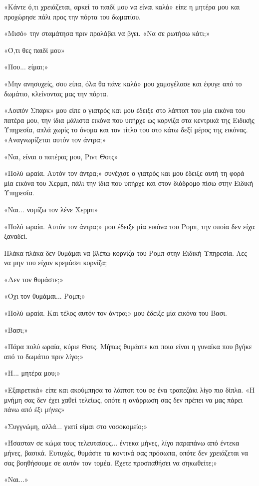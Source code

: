 \documentclass[12pt,twoside, openany]{book}
\begin{document}
«Κάντε ό,τι χρειάζεται, αρκεί το παιδί μου να είναι καλά» είπε η μητέρα μου και προχώρησε πάλι προς την πόρτα του δωματίου.

«Μισό» την σταμάτησα πριν προλάβει να βγει. «Να σε ρωτήσω κάτι;»

«Ό,τι θες παιδί μου»

«Που... είμαι;»

«Μην ανησυχείς, σου είπα, όλα θα πάνε καλά» μου χαμογέλασε και έφυγε από το δωμάτιο, κλείνοντας μας την πόρτα.

«Λοιπόν Σπαρκ» μου είπε ο γιατρός και μου έδειξε στο λάπτοπ του μία εικόνα του πατέρα μου, την ίδια μάλιστα εικόνα που υπήρχε ως κορνίζα στα κεντρικά της Ειδικής Υπηρεσία, απλά χωρίς το όνομα και τον τίτλο του στο κάτω δεξί μέρος της εικόνας. «Αναγνωρίζεται αυτόν τον άντρα;»

«Ναι, είναι ο πατέρας μου, Ριντ Θοτς»

«Πολύ ωραία. Αυτόν τον άντρα;» συνέχισε ο γιατρός και μου έδειξε αυτή τη φορά μία εικόνα του Χερμπ, πάλι την ίδια που υπήρχε και στον διάδρομο πίσω στην Ειδική Υπηρεσία.

«Ναι... νομίζω τον λένε Χερμπ»

«Πολύ ωραία. Αυτόν τον άντρα;» μου έδειξε μία εικόνα του Ρομπ, την οποία δεν είχα ξαναδεί.

Πλάκα πλάκα δεν θυμάμαι να βλέπω κορνίζα του Ρομπ στην Ειδική Υπηρεσία. Λες να μην του είχαν κρεμάσει κορνίζα;

«Δεν τον θυμάστε;»

«Όχι τον θυμάμαι... Ρομπ;»

«Πολύ ωραία. Και τέλος αυτόν τον άντρα;» μου έδειξε μία εικόνα του Βασι.

«Βασι;»

«Πάρα πολύ ωραία, κύριε Θοτς. Μήπως θυμάστε και ποια είναι η γυναίκα που βγήκε από το δωμάτιο πριν λίγο;»

«Η... μητέρα μου;»

«Εξαιρετικά» είπε και ακούμπησα το λάπτοπ του σε ένα τραπεζάκι λίγο πιο δίπλα. «Η μνήμη σας δεν έχει χαθεί τελείως, οπότε η ανάρρωση σας δεν πρέπει να μας πάρει πάνω από έξι μήνες»

«Συγγνώμη, αλλά... γιατί είμαι στο νοσοκομείο;»

«Ήσασταν σε κώμα τους τελευταίους... έντεκα μήνες, λίγο παραπάνω από έντεκα μήνες, βασικά. Ευτυχώς, θυμάστε τα κοντινά σας πρόσωπα, οπότε δεν χρειάζεται να σας βοηθήσουμε σε αυτόν τον τομέα. Έχετε προσπαθήσει να σηκωθείτε;»

«Ναι...»
\end{document}
